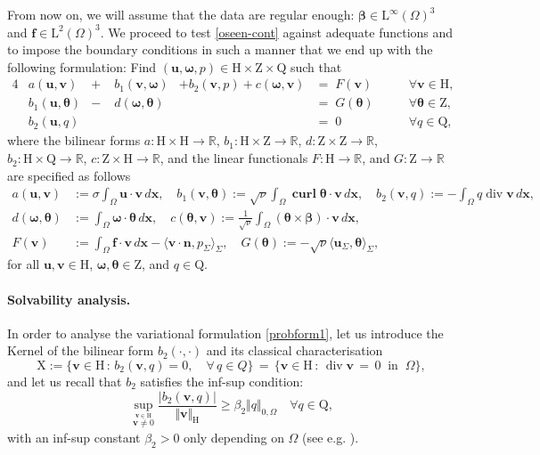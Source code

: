 \documentclass[reqno,a4paper]{article}
\numberwithin{equation}{section}
\newcommand\ff{\boldsymbol{f}}
\newcommand\bu{\boldsymbol{u}}
\newcommand\bv{\boldsymbol{v}}
\newcommand\bx{\boldsymbol{x}}
\newcommand\bbbeta{\boldsymbol{\beta}}
\newcommand\R{\mathbb{R}}
\renewcommand\O{\Omega}
\renewcommand\H{\mathrm{H}}
\renewcommand\L{\mathrm{L}}
\newcommand\Q{\mathrm{Q}}
\newcommand\Z{\mathrm{Z}}
\newcommand\X{\mathrm{X}}
\newcommand\vdiv{\mathop{\mathrm{div}}\nolimits}
\newcommand\bn{\boldsymbol{n}}
\newcommand\bomega{\boldsymbol{\omega}}
\newcommand\btheta{\boldsymbol{\theta}}
\newcommand\curl{\mathop{\mathbf{curl}}\nolimits}
\begin{document}
From now on, we will assume that the data are regular enough: $\bbbeta\in \L^{\infty}(\O)^3$ and $\ff\in\L^2(\O)^3$. 
We proceed to test  \eqref{oseen-cont} against adequate
functions and to impose the boundary conditions in such a manner that 
we end up with the following formulation: 
 Find $(\bu,\bomega,p)\in\H\times\Z\times\Q$ such that 
\begin{alignat}{4}
&a(\bu,\bv)      &+&\;b_{1}(\bv,\bomega)&+b_2(\bv,p)
+c(\bomega,\bv)&=\;F(\bv)&\qquad\forall\bv\in\H,\nonumber\\
&b_{1}(\bu,\btheta)&-&\;d(\bomega,\btheta)&           
&=\;G(\btheta)&\qquad\forall\btheta\in\Z,\label{probform1}\\
&b_2(\bu,q)      & &                &           & =\;0 & \qquad\forall q\in\Q,\nonumber
\end{alignat}
where the bilinear forms
$a:\H\times\H\to\R$,
$b_1:\H\times\Z\to\R$,
$d:\Z\times\Z\to\R$,
$b_2:\H\times\Q\to\R$,
$c:\Z\times\H\to\R$, and the
linear functionals $F:\H\to\R$, and $G:\Z\to\R$ are
specified as follows 
\begin{align*} 
a(\bu,\bv)&:=\sigma\int_{\O}\bu\cdot\bv\,d\bx,\quad 
b_1(\bv,\btheta):=\sqrt{\nu}\int_{\O}\curl\btheta\cdot\bv\,d\bx,\quad 
b_2(\bv,q):=-\int_{\O}q\vdiv\bv\,d\bx,\\
d(\bomega,\btheta)&:=\int_{\O}\bomega\cdot\btheta\,d\bx,\quad
c(\btheta,\bv):=\frac{1}{\sqrt{\nu}}\int_{\O}(\btheta\times\bbbeta)\cdot\bv\,d\bx,\\ 
F(\bv)&:=\int_{\O}\ff\cdot\bv\,d\bx-\langle\bv\cdot\bn, p_\Sigma\rangle_{\Sigma},\quad 
G(\btheta):=-\sqrt{\nu}\langle \bu_{\Sigma},\btheta\rangle_{\Sigma},
\end{align*}
for all $\bu,\bv\in\H$, $\bomega,\btheta\in\Z$, and $q\in\Q$.

\paragraph{Solvability analysis.}
In order to analyse the variational formulation \eqref{probform1},
let us introduce the Kernel of the bilinear form $b_2(\cdot,\cdot)$ and 
its classical characterisation 
$$ \X := \{ \bv \in \H\,:\, b_2(\bv,q)=0,\quad \forall \, q\in Q\}\,
=\,\{ \bv \in \H\,:\, \vdiv \bv \,=\,0\;\;\text{in}\;\;\O\},$$
and let us recall that $b_2$ satisfies the inf-sup condition:
\begin{equation}\label{eq:inf-sup-b2}
\sup_{\stackrel{\scriptstyle\bv\in\H}{\bv\ne0}}\frac{\vert
  b_{2}(\bv,q)\vert}{\Vert\bv\Vert_{\H}}\ge \beta_2\Vert
  q\Vert_{0,\O}\quad\forall q\in\Q,
\end{equation}
with an inf-sup constant $\beta_2>0$ only depending on $\Omega$ (see e.g. \cite{G2014}).
\end{document}
